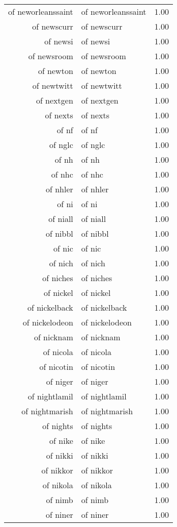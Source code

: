 \begin{table}[ht]
\begin{tabular}{rlr}
  of neworleanssaint & of neworleanssaint & 1.00 \\ 
  of newscurr & of newscurr & 1.00 \\ 
  of newsi & of newsi & 1.00 \\ 
  of newsroom & of newsroom & 1.00 \\ 
  of newton & of newton & 1.00 \\ 
  of newtwitt & of newtwitt & 1.00 \\ 
  of nextgen & of nextgen & 1.00 \\ 
  of nexts & of nexts & 1.00 \\ 
  of nf & of nf & 1.00 \\ 
  of nglc & of nglc & 1.00 \\ 
  of nh & of nh & 1.00 \\ 
  of nhc & of nhc & 1.00 \\ 
  of nhler & of nhler & 1.00 \\ 
  of ni & of ni & 1.00 \\ 
  of niall & of niall & 1.00 \\ 
  of nibbl & of nibbl & 1.00 \\ 
  of nic & of nic & 1.00 \\ 
  of nich & of nich & 1.00 \\ 
  of niches & of niches & 1.00 \\ 
  of nickel & of nickel & 1.00 \\ 
  of nickelback & of nickelback & 1.00 \\ 
  of nickelodeon & of nickelodeon & 1.00 \\ 
  of nicknam & of nicknam & 1.00 \\ 
  of nicola & of nicola & 1.00 \\ 
  of nicotin & of nicotin & 1.00 \\ 
  of niger & of niger & 1.00 \\ 
  of nightlamil & of nightlamil & 1.00 \\ 
  of nightmarish & of nightmarish & 1.00 \\ 
  of nights & of nights & 1.00 \\ 
  of nike & of nike & 1.00 \\ 
  of nikki & of nikki & 1.00 \\ 
  of nikkor & of nikkor & 1.00 \\ 
  of nikola & of nikola & 1.00 \\ 
  of nimb & of nimb & 1.00 \\ 
  of niner & of niner & 1.00 \\ 

\end{tabular}
\end{table}
